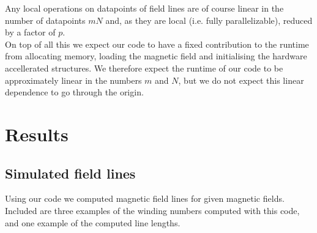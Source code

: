 \documentclass[a4paper]{article}
\begin{document}
Any local operations on datapoints of field lines are of course linear in the number of datapoints $mN$ and, as they are local (i.e. fully parallelizable), reduced by a factor of $p$.\\
On top of all this we expect our code to have a fixed contribution to the runtime from allocating memory, loading the magnetic field and initialising the hardware accellerated structures. We therefore expect the runtime of our code to be approximately linear in the numbers $m$ and $N$, but we do not expect this linear dependence to go through the origin.
\newpage
\section{Results}
\subsection{Simulated field lines}
Using our code we computed magnetic field lines for given magnetic fields. Included are three examples of the winding numbers computed with this code, and one example of the computed line lengths.
\end{document}
